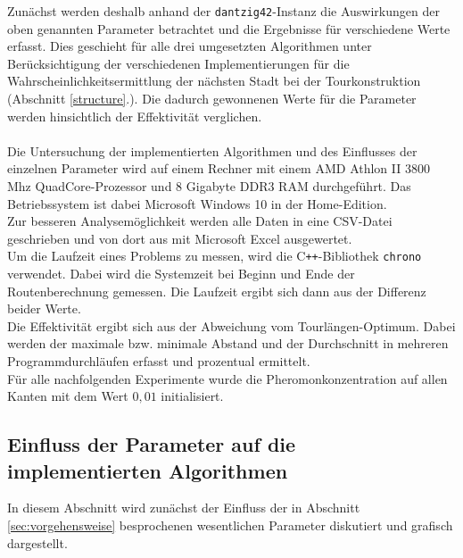 \documentclass[doktyp=barbeit, sprache=german]{TUBAFarbeiten}
\begin{document}
Zunächst werden deshalb anhand der \texttt{dantzig42}-Instanz die Auswirkungen der oben genannten Parameter betrachtet und die Ergebnisse für verschiedene Werte erfasst.
Dies geschieht für alle drei umgesetzten Algorithmen unter Berücksichtigung der verschiedenen Implementierungen für die Wahrscheinlichkeitsermittlung der nächsten Stadt bei der Tourkonstruktion (Abschnitt \ref{structure}.).
Die dadurch gewonnenen Werte für die Parameter werden hinsichtlich der Effektivität verglichen. 
\\\\Die Untersuchung der implementierten Algorithmen und des Einflusses der einzelnen Parameter wird auf einem Rechner mit einem AMD Athlon II 3800 Mhz QuadCore-Prozessor und 8 Gigabyte DDR3 RAM durchgeführt. Das Betriebssystem ist dabei Microsoft Windows 10 in der Home-Edition.
\\Zur besseren Analysemöglichkeit werden alle Daten in eine CSV-Datei geschrieben und von dort aus mit Microsoft Excel ausgewertet.
\\Um die Laufzeit eines Problems zu messen, wird die C\texttt{++}-Bibliothek \texttt{chrono} verwendet. Dabei wird die Systemzeit bei Beginn und Ende der Routenberechnung gemessen. Die Laufzeit ergibt sich dann aus der Differenz beider Werte. 
\\Die Effektivität ergibt sich aus der Abweichung vom Tourlängen-Optimum. Dabei werden der maximale bzw. minimale Abstand und der Durchschnitt in mehreren Programmdurchläufen erfasst und prozentual ermittelt.
\\Für alle nachfolgenden Experimente wurde die Pheromonkonzentration auf allen Kanten mit dem Wert $0,01$ initialisiert.
\subsection{Einfluss der Parameter auf die implementierten Algorithmen}
\label{sec:einflussparameter}
In diesem Abschnitt wird zunächst der Einfluss der in Abschnitt \ref{sec:vorgehensweise} besprochenen wesentlichen Parameter diskutiert und grafisch dargestellt. 
\end{document}
